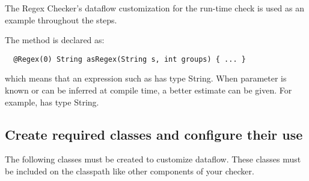 The Regex Checker's dataflow customization for the 
run-time check is used as an example throughout the steps.

The  method is declared as:

\begin{smaller}
\begin{Verbatim}
  @Regex(0) String asRegex(String s, int groups) { ... }
\end{Verbatim}
\end{smaller}

\noindent
which means that an expression such as 
has type  String. When  parameter  is
known or can be inferred at compile time, a better estimate can be given.  For
example,  has type  String.

\subsection{Create required classes and configure their
  use\label{dataflow-create-classes}}

The following classes must be created to customize dataflow. These classes must
be included on the classpath like other components of your checker.

